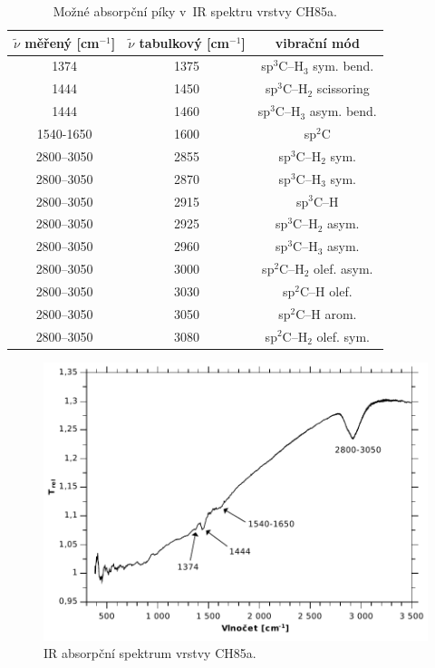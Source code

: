 \documentclass[12pt]{article}
\begin{document}
\begin{table}[htbp]
\begin{center}
\begin{tabular}{|c|c|c|}
\hline
$\tilde{\nu}$ měřený [cm$^{-1}$] & $\tilde{\nu}$ tabulkový [cm$^{-1}$] & vibrační mód \\ \hline
1374 & 1375 & sp$^3$C--H$_3$ sym. bend. \\ \hline
1444 & 1450 & sp$^3$C--H$_2$ scissoring \\ \hline
1444 & 1460 & sp$^3$C--H$_3$ asym. bend. \\ \hline
1540-1650 & 1600 & sp$^2$C \\ \hline
2800--3050 & 2855 & sp$^3$C--H$_2$ sym.  \\ \hline  
2800--3050 & 2870 & sp$^3$C--H$_3$ sym.  \\ \hline  
2800--3050 & 2915 & sp$^3$C--H  \\ \hline
2800--3050 & 2925 & sp$^3$C--H$_2$ asym.  \\ \hline
2800--3050 & 2960 & sp$^3$C--H$_3$ asym.  \\ \hline
2800--3050 & 3000 & sp$^2$C--H$_2$ olef. asym.  \\ \hline
2800--3050 & 3030 & sp$^2$C--H olef.  \\ \hline
2800--3050 & 3050 & sp$^2$C--H arom.  \\ \hline
2800--3050 & 3080 & sp$^2$C--H$_2$ olef. sym.  \\ \hline
\end{tabular}
\caption{Možné absorpční píky v~IR spektru vrstvy CH85a.}
\label{CH85IR}
\end{center}
\end{table}

\begin{figure}
  \centering
  \includegraphics[width=135mm]{img/CH85-T.pdf}
  \caption{IR absorpční spektrum vrstvy CH85a.}
  \label{CH85aIR}
\end{figure}
\end{document}
